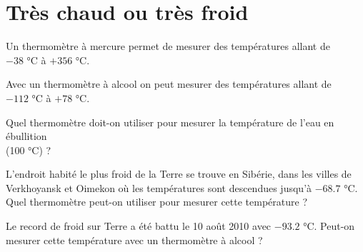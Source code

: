 \section{Très chaud ou très froid}

Un thermomètre à mercure permet de mesurer des températures allant de \\ \noindent $-38$ °C à  $+356$ °C.

Avec un thermomètre à alcool on peut mesurer des températures allant de \\ \noindent $-112$ °C à  $+78$ °C.

\begin{questions}
	\question Quel thermomètre doit-on utiliser pour mesurer la température de l'eau en ébullition \\ \noindent (100 °C) ?
	
	\question L'endroit habité le plus froid de la Terre se trouve en Sibérie, dans les villes de Verkhoyansk et Oimekon où les températures sont descendues jusqu'à $\num{-68.7}$ °C. Quel thermomètre peut-on utiliser pour mesurer cette température ?
	
	\question Le record de froid sur Terre a été battu le 10 août 2010 avec $\num{-93.2}$ °C. Peut-on mesurer cette température avec un thermomètre à alcool ?
\end{questions}